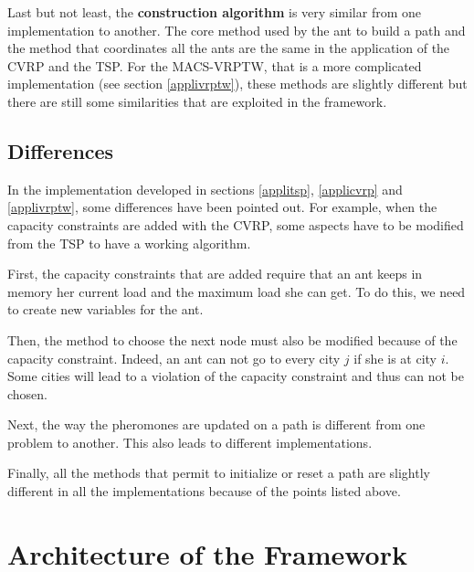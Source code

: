 Last but not least, the \textbf{construction algorithm} is very similar from one implementation to another. The core method used by the ant to build a path and the method that coordinates all the ants are the same in the application of the CVRP and the TSP. For the MACS-VRPTW, that is a more complicated implementation (see section \ref{applivrptw}), these methods are slightly different but there are still some similarities that are exploited in the framework.


\subsection{Differences}\label{differences}
 
In the implementation developed in sections \ref{applitsp}, \ref{applicvrp} and \ref{applivrptw}, some differences have been pointed out. For example, when the capacity constraints are added with the CVRP, some aspects have to be modified from the TSP to have a working algorithm. 

First, the capacity constraints that are added require that an ant keeps in memory her current load and the maximum load she can get. To do this, we need to create new variables for the ant. 

Then, the method to choose the next node must also be modified because of the capacity constraint. Indeed, an ant can not go to every city $j$ if she is at city $i$. Some cities will lead to a violation of the capacity constraint and thus can not be chosen. 

Next, the way the pheromones are updated on a path is different from one problem to another. This also leads to different implementations.

Finally, all the methods that permit to initialize or reset a path are slightly different in all the implementations because of the points listed above.

\section{Architecture of the Framework}

